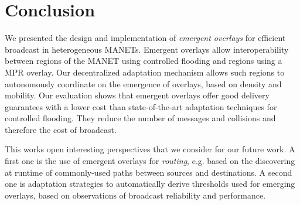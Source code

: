 
\section{Conclusion}
\label{sec:conclusion}

We presented the design and implementation of \emph{emergent overlays} for efficient broadcast in heterogeneous MANETs.
Emergent overlays allow interoperability between regions of the MANET using controlled flooding and regions using a MPR overlay.
Our decentralized adaptation mechanism allows such regions to autonomously coordinate on the emergence of  overlays, based on density and mobility.
Our evaluation shows that emergent overlays offer good delivery guarantees with a lower cost than state-of-the-art adaptation techniques for controlled flooding.
They reduce the number of messages and collisions and therefore the cost of broadcast.

This works open interesting perspectives that we consider for our future work.
A first one is the use of emergent overlays for \emph{routing}, e.g. based on the discovering at runtime of commonly-used paths between sources and destinations.
A second one is adaptation strategies to automatically derive thresholds used for emerging overlays, based on observations of broadcast reliability and performance.
